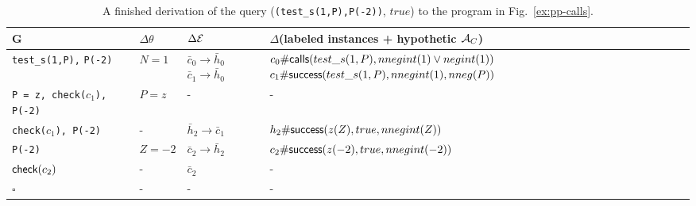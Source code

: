 \documentclass{llncs}
\newcommand{\AC}
  {\ensuremath{{\cal A}_{C}}}
\newcommand{\kbd}[1]{\mbox{\tt #1}}
\newcommand{\emptyGoal}{\ensuremath{\square}}
\newcommand{\ADeps}{\ensuremath{{\cal E}}}
\newcommand{\asrId}[1]{\ensuremath{c_{#1}}}
\newcommand{\negAsrId}[1]{\ensuremath{\bar{c}_{#1}}}
\newcommand{\hypId}[1]{\ensuremath{h_{#1}}}
\newcommand{\negHypId}[1]{\ensuremath{\bar{h}_{#1}}}
\newcommand{\checkLitLab}[1]{\ensuremath{\textsf{check}(#1)}}
\newcommand{\labCallsAsr}[3]
  {\ensuremath{\textsf{\asrId{#1}\#calls}(#2, #3)}}
\newcommand{\labSuccessAsr}[4]
  {\ensuremath{\textsf{\asrId{#1}\#success}(#2, #3, #4)}}
\newcommand{\hypSuccessAsr}[4]
  {\ensuremath{\textsf{\hypId{#1}\#success}(#2, #3, #4)}}
\begin{document}
\begin{table}[h]
  \caption{A finished derivation of the query 
    (\kbd{(test\_s(1,P),P(-2))}, $true$) to the program in 
    Fig.~\ref{ex:pp-calls}.}
  \begin{minipage}{\textwidth}
    \small
    \begin{tabular}{p{}|p{}p{}p{}}
      \hline
      G         
         & $\Delta\theta$  
         & $\Delta\ADeps$ 
          & $\Delta$(labeled instances + hypothetic $\AC$)
      \\ \hline
      {\tt test\_s(1,P),}\newline
      \kbd{P(-2)}
          & $N = 1$        
          & $\negAsrId{0} \rightarrow \negHypId{0}$ \newline
            $\negAsrId{1} \rightarrow \negHypId{0}$
          & $\labCallsAsr{0}{test\_s(1,P)}{nnegint(1) \vee negint(1)}$
            \newline
            $\labSuccessAsr{1}{test\_s(1,P)}{nnegint(1)}{nneg(P)}$     
      \\ \hline
      {\tt P = z, check(\asrId{1}),}\newline
      \texttt{P(-2)}
          & $P = z$
          & -
          & -
      \\ \hline
      {\tt check(\asrId{1}), P(-2)}
          & -
          & $\negHypId{2} \rightarrow \negAsrId{1}$
          & $\hypSuccessAsr{2}{z(Z)}{true}{nnegint(Z)}$
      \\ \hline
      \texttt{P(-2)}
          & $Z = -2$
          & $\negAsrId{2} \rightarrow \negHypId{2}$
          & $\labSuccessAsr{2}{z(-2)}{true}{nnegint(-2)}$
      \\ \hline
      \checkLitLab{$\asrId{2}$}
        & -
        & $\negAsrId{2}$ 
        & -
      \\ \hline
      \emptyGoal
          & -        
          & -
          & -
      \\ \hline
    \end{tabular}
  \end{minipage}
  \label{tbl:test5}
\end{table}
\end{document}
